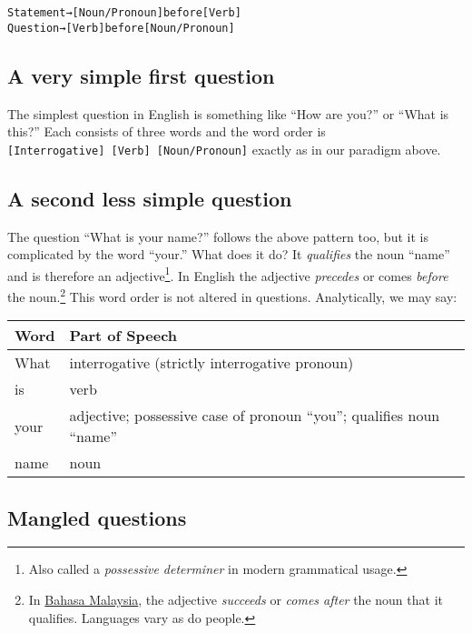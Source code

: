 \documentclass[
  12pt,
  a4paper,
]{article}
\newcommand\noun[1]{\textcolor{noun}{#1}}
\newcommand\pronoun[1]{\textcolor{pronoun}{#1}}
\newcommand\action[1]{\textcolor{action}{#1}}
\begin{document}
\begin{tcolorbox}
\begin{alltt}
\color{normal}
Statement → [\noun{Noun}/\pronoun{Pronoun}] before [\action{Verb}]
Question  → [\action{Verb}] before [\noun{Noun}/\pronoun{Pronoun}]
\end{alltt}
\end{tcolorbox}

\hypertarget{a-very-simple-first-question}{%
\subsection{A very simple first
question}\label{a-very-simple-first-question}}

The simplest question in English is something like ``How are you?'' or
``What is this?'' Each consists of three words and the word order is
\texttt{{[}Interrogative{]}\ {[}Verb{]}\ {[}Noun/Pronoun{]}} exactly as
in our paradigm above.

\hypertarget{a-second-less-simple-question}{%
\subsection{A second less simple
question}\label{a-second-less-simple-question}}

The question ``What is your name?'' follows the above pattern too, but
it is complicated by the word ``your.'' What does it do? It
\emph{qualifies} the noun ``name'' and is therefore an
adjective\footnote{Also called a \emph{possessive determiner} in modern
  grammatical usage.}. In English the adjective \emph{precedes} or comes
\emph{before} the noun.\footnote{In
  \href{http://en.wikipedia.org/wiki/Bahasa_Malaysia}{Bahasa Malaysia},
  the adjective \emph{succeeds} or \emph{comes after} the noun that it
  qualifies. Languages vary as do people.} This word order is not
altered in questions. Analytically, we may say:

\begin{longtable}[]{@{}ll@{}}
\toprule
Word & Part of Speech\tabularnewline
\midrule
\endhead
What & interrogative (strictly interrogative pronoun)\tabularnewline
is & verb\tabularnewline
your & adjective; possessive case of pronoun ``you''; qualifies noun
``name''\tabularnewline
name & noun\tabularnewline
\bottomrule
\end{longtable}

\hypertarget{mangled-questions}{%
\subsection{Mangled questions}\label{mangled-questions}}
\end{document}

